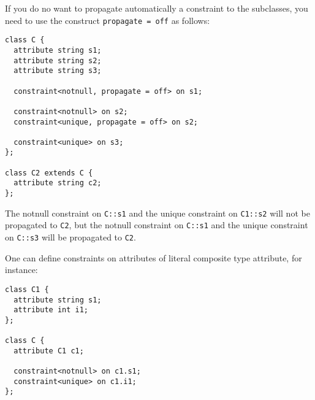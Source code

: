 If you do no want to propagate automatically a constraint to the subclasses,
you need to use the construct \texttt{propagate = off} as follows:
\vspace{-0.2cm}
\begin{verbatim}
class C {
  attribute string s1;
  attribute string s2;
  attribute string s3;

  constraint<notnull, propagate = off> on s1;

  constraint<notnull> on s2;
  constraint<unique, propagate = off> on s2;

  constraint<unique> on s3;
};

class C2 extends C {
  attribute string c2;
};
\end{verbatim}
The notnull constraint on \texttt{C::s1} and the unique constraint
on \texttt{C1::s2} will not be propagated to \texttt{C2}, but the
notnull constraint on \texttt{C::s1} and the unique constraint on
\texttt{C::s3} will be propagated to \texttt{C2}.

One can define constraints on attributes of literal composite type
attribute, for instance:
\vspace{-0.2cm}
\begin{verbatim}
class C1 {
  attribute string s1;
  attribute int i1;
};

class C {
  attribute C1 c1;
 
  constraint<notnull> on c1.s1;
  constraint<unique> on c1.i1;
};
\end{verbatim}

